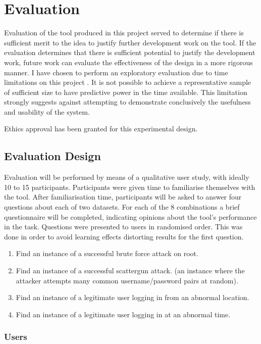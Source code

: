 \chapter{Evaluation}\label{eval}

Evaluation of the tool produced in this project served to determine if there is sufficient merit to the idea to justify further development work on the tool. If the evaluation determines that there is sufficient potential to justify the development work, future work can evaluate the effectiveness of the design in a more rigorous manner. I have chosen to perform an exploratory evaluation due to time limitations on this project \cite{Ellis:2006:EAU:1168149.1168152}. It is not possible to achieve a representative sample of sufficient size to have predictive power in the time available. This limitation strongly suggests against attempting to demonstrate conclusively the usefulness and usability of the system. 

Ethics approval has been granted for this experimental design.

\section{Evaluation Design}

Evaluation will be performed by means of a qualitative user study, with ideally 10 to 15 participants. 
Participants were given time to familiarise themselves with the tool.
After familiarisation time, participants will be asked to answer four questions about each of two datasets.
For each of the 8 combinations a brief questionnaire will be completed, indicating opinions about the tool's performance in the task\cite{lewis1995ibm}.
Questions were presented to users in randomised order. This was done in order to avoid learning effects distorting results for the first question.
\begin{enumerate}
\item{Find an instance of a successful brute force attack on root.}
\item{Find an instance of a successful scattergun attack.
(an instance where the attacker attempts many common username/password pairs at random).}
\item{Find an instance of a legitimate user logging in from an abnormal location.}
\item{Find an instance of a legitimate user logging in at an abnormal time.}
\end{enumerate}

\subsection{Users}

